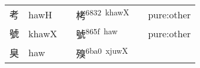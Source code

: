 \documentclass[14pt,a4paper]{scrartcl}
\begin{document}
\begin{longtable}[c]{@{}llllll@{}}
\begin{minipage}[t]{0.14\columnwidth}
考
\strut\end{minipage} &
\begin{minipage}[t]{0.14\columnwidth}\raggedright\strut
hawH
\strut\end{minipage} &
\begin{minipage}[t]{0.14\columnwidth}\raggedright\strut
\strut\end{minipage} &
\begin{minipage}[t]{0.14\columnwidth}\raggedright\strut
栲\textsuperscript{6832~khawX}
\strut\end{minipage} &
\begin{minipage}[t]{0.14\columnwidth}\raggedright\strut
\strut\end{minipage} &
\begin{minipage}[t]{0.14\columnwidth}\raggedright\strut
pure:other
\strut\end{minipage}\tabularnewline
\begin{minipage}[t]{0.14\columnwidth}\raggedright\strut
號
\strut\end{minipage} &
\begin{minipage}[t]{0.14\columnwidth}\raggedright\strut
khawX
\strut\end{minipage} &
\begin{minipage}[t]{0.14\columnwidth}\raggedright\strut
\strut\end{minipage} &
\begin{minipage}[t]{0.14\columnwidth}\raggedright\strut
號\textsuperscript{865f~haw}
\strut\end{minipage} &
\begin{minipage}[t]{0.14\columnwidth}\raggedright\strut
\strut\end{minipage} &
\begin{minipage}[t]{0.14\columnwidth}\raggedright\strut
pure:other
\strut\end{minipage}\tabularnewline
\begin{minipage}[t]{0.14\columnwidth}\raggedright\strut
臭
\strut\end{minipage} &
\begin{minipage}[t]{0.14\columnwidth}\raggedright\strut
haw
\strut\end{minipage} &
\begin{minipage}[t]{0.14\columnwidth}\raggedright\strut
\strut\end{minipage} &
\begin{minipage}[t]{0.14\columnwidth}\raggedright\strut
殠\textsuperscript{6ba0~xjuwX}
\strut\end{minipage} &

\end{longtable}
\end{document}
